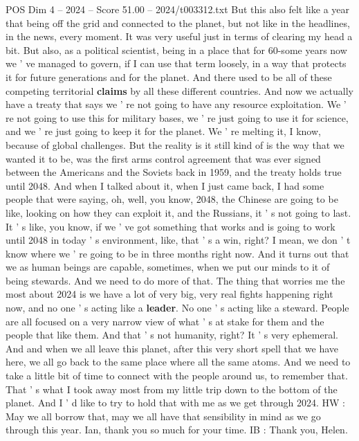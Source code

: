 \begin{textsample}{POS Dim 4 – 2024 – Score 51.00 – 2024/t003312.txt}
But this also felt like a year that being off the grid and connected to the planet, but not like in the headlines, in the news, every moment.
It was very useful just in terms of clearing my head a bit.
But also, as a political scientist, being in a place that for 60-some years now we ' ve managed to govern, if I can use that term loosely, in a way that protects it for future generations and for the planet.
And there used to be all of these competing territorial \textbf{claims} by all these different countries.
And now we actually have a treaty that says we ' re not going to have any resource exploitation.
We ' re not going to use this for military bases, we ' re just going to use it for science, and we ' re just going to keep it for the planet.
We ' re melting it, I know, because of global challenges.
But the reality is it still kind of is the way that we wanted it to be, was the first arms control agreement that was ever signed between the Americans and the Soviets back in 1959, and the treaty holds true until 2048.
And when I talked about it, when I just came back, I had some people that were saying, oh, well, you know, 2048, the Chinese are going to be like, looking on how they can exploit it, and the Russians, it ' s not going to last.
It ' s like, you know, if we ' ve got something that works and is going to work until 2048 in today ' s environment, like, that ' s a win, right?
I mean, we don ' t know where we ' re going to be in three months right now.
And it turns out that we as human beings are capable, sometimes, when we put our minds to it of being stewards.
And we need to do more of that.
The thing that worries me the most about 2024 is we have a lot of very big, very real fights happening right now, and no one ' s acting like a \textbf{leader}.
No one ' s acting like a steward.
People are all focused on a very narrow view of what ' s at stake for them and the people that like them.
And that ' s not humanity, right?
It ' s very ephemeral.
And and when we all leave this planet, after this very short spell that we have here, we all go back to the same place where all the same atoms.
And we need to take a little bit of time to connect with the people around us, to remember that.
That ' s what I took away most from my little trip down to the bottom of the planet.
And I ' d like to try to hold that with me as we get through 2024.
HW : May we all borrow that, may we all have that sensibility in mind as we go through this year.
Ian, thank you so much for your time.
IB : Thank you, Helen.

\end{textsample}
